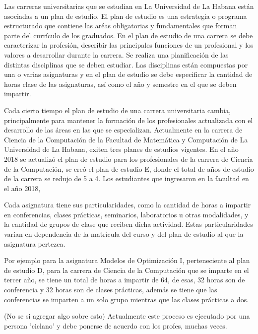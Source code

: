 
Las carreras universitarias que se estudian en La Universidad de La Habana están
asociadas a un plan de estudio. El plan de estudio es una estrategia o programa estructurado
que contiene las aréas obligatorias y fundamentales que forman parte del currículo de los 
graduados. En el plan de estudio de una carrera 
se debe caracterizar la profesión, describir las principales funciones de un profesional y 
los valores a desarrollar durante la carrera. Se realiza una planificación de las distintas 
disciplinas que se deben estudiar. Las disciplinas están compuestas por una o varias 
asignaturas y en el plan de estudio se debe especificar la cantidad de horas clase de 
las asignaturas, así como el año y semestre en el que se deben impartir.

Cada cierto tiempo el plan de estudio de una carrera universitaria cambia, principalmente
para mantener la formación de los profesionales actualizada con el desarrollo de las áreas en 
las que se especializan. Actualmente en la carrera de Ciencia de la 
Computación de la Facultad de Matemática 
y Computación de La Universidad de La Habana, exiten tres planes de estudios 
vigentes. En el año 2018 se actualizó el plan de estudio para los profesionales de la 
carrera de Ciencia de la Computación, se creó el plan de estudio E, donde el total de años 
de estudio de la carrera se redujo de 5 a 4. Los estudiantes que ingresaron en la facultad en 
el año 2018,  


Cada asignatura tiene sus particularidades, como la cantidad de horas
a impartir en conferencias, clases prácticas, seminarios, laboratorios u
otras modalidades, y la cantidad de grupos de clase que reciben dicha 
actividad. Estas particularidades varían en dependencia de la matrícula 
del curso y del plan de estudio al que la asignatura pertezca.

Por ejemplo para la asignatura Modelos de Optimización I, perteneciente
al plan de estudio D, para la carrera de Ciencia de la Computación que 
se imparte en el tercer año, se tiene un total de horas a impartir de 64,
de esas, 32 horas son de conferencia y 32 horas son de clases prácticas,
además se tiene que las conferencias se imparten a un solo grupo mientras
que las clases prácticas a dos.

(No se si agregar algo sobre esto)
Actualmente este proceso es ejecutado por una persona 'ciclano' y debe
ponerse de acuerdo con los profes, muchas veces.


